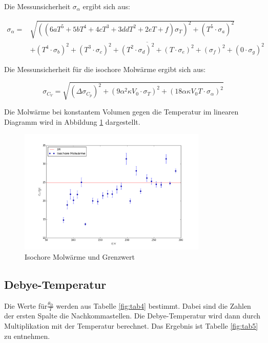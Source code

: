 \noindent Die Messunsicherheit \(\sigma_\alpha\) ergibt sich aus:

\begin{align}
\sigma_\alpha = & \sqrt{((6aT^5+5bT^4+4cT^3+3ddT^2+2eT+f)\sigma_T)^2+(T^5\cdot\sigma_a)^2} \\
& \overline{+(T^4\cdot\sigma_b)^2+(T^3\cdot\sigma_c)^2+(T^2\cdot\sigma_d)^2+(T\cdot\sigma_e)^2+(\sigma_f)^2+(0\cdot\sigma_g)^2}
\end{align}

\noindent Die Messunsicherheit für die isochore Molwärme ergibt sich aus:

\begin{equation}
\sigma_{C_V}=\sqrt{(\Delta\sigma_{C_p})^2 + (9\alpha^2\kappa V_0\cdot\sigma_T)^2 + (18\alpha\kappa V_0T\cdot\sigma_\alpha)^2}
\end{equation}

\noindent Die Molwärme bei konstantem Volumen gegen die Temperatur im linearen Diagramm wird in Abbildung \ref{fig:abb2} dargestellt.

\begin{figure}
	\centering
		\includegraphics[width=0.8\textwidth]{cv.png}
	\caption{Isochore Molwärme und Grenzwert}
	\label{fig:abb2}
\end{figure}

\subsection{Debye-Temperatur}
Die Werte für\(\frac{\theta_\text{D}}{T}\) werden aus Tabelle \ref{fig:tab4} bestimmt. Dabei sind die Zahlen der ersten Spalte die Nachkommastellen. Die Debye-Temperatur wird dann durch Multiplikation mit der Temperatur berechnet. Das Ergebnis ist Tabelle \ref{fig:tab5} zu entnehmen.

